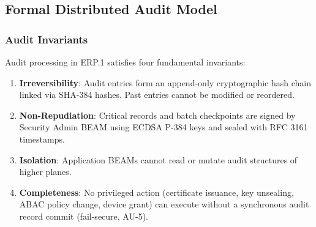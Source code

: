 \documentclass{article}
\begin{document}
\subsection{Formal Distributed Audit Model}

\subsubsection{Audit Invariants}
Audit processing in ERP.1 satisfies four fundamental invariants:
\begin{enumerate}
    \item \textbf{Irreversibility}: Audit entries form an append-only cryptographic hash chain linked via SHA-384 hashes. Past entries cannot be modified or reordered.
    \item \textbf{Non-Repudiation}: Critical records and batch checkpoints are signed by Security Admin BEAM using ECDSA P-384 keys and sealed with RFC 3161 timestamps.
    \item \textbf{Isolation}: Application BEAMs cannot read or mutate audit structures of higher planes.
    \item \textbf{Completeness}: No privileged action (certificate issuance, key unsealing, ABAC policy change, device grant) can execute without a synchronous audit record commit (fail-secure, AU-5).
\end{enumerate}
\end{document}
